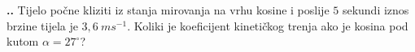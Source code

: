 

\noindent 
\textbf{
\thecjelina.\thezadatak.}
Tijelo počne kliziti iz stanja mirovanja na vrhu kosine i poslije $5$ sekundi iznos brzine tijela je $3,6\ ms^{-1}$. Koliki je koeficijent kinetičkog trenja ako je kosina pod kutom $\alpha=27^\circ$?


